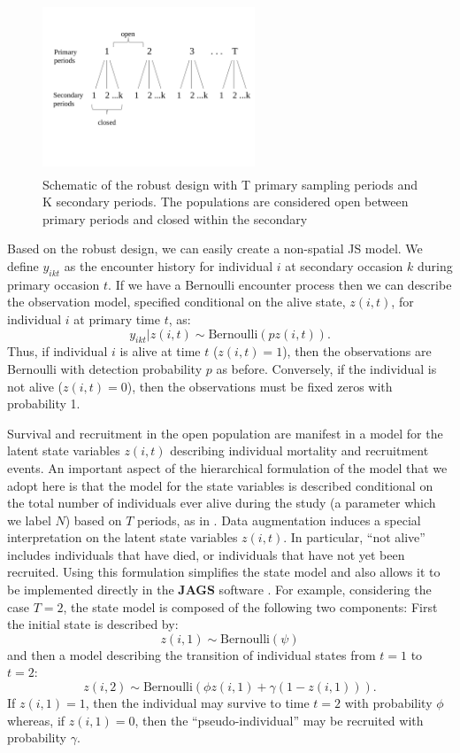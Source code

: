 \begin{figure}[h]
\centering
\includegraphics[height=2in,width=2.5in]{Ch16-Open/figs/RobustDesign.pdf}
\caption{Schematic of the robust design with T primary sampling periods and K secondary periods. The populations
are considered open between primary periods and closed within the secondary}
\label{open.figs.robustdesign}
\end{figure}

Based on the robust design, we can easily create a non-spatial JS model.  We define $y_{ikt}$ as the encounter
history for individual $i$ at secondary occasion $k$ during primary occasion $t$.  If we have a Bernoulli encounter
process then we can describe the observation model, specified
conditional on the alive state, $z(i,t)$, for individual $i$ at primary time $t$, as:
 \[
  y_{ikt}|z(i,t) \sim
\mbox{Bernoulli}(p z(i,t)).
\]
Thus, if individual $i$ is alive at time $t$ ($z(i,t)=1$), then the
observations are Bernoulli with detection probability $p$ as before.  Conversely, if the individual is
not alive ($z(i,t)=0$), then the observations must be fixed zeros with
probability 1.

Survival and recruitment in the open population are manifest in a
model for the latent state variables $z(i,t)$ describing individual
mortality and recruitment events.  An important aspect of the
hierarchical formulation of the model that we adopt here is that the
model for the state variables is described conditional on the total
number of individuals ever alive during the study (a parameter which
we label $N$) based on $T$ periods, as in \cite{schwarz_arnason:1996}.  Data
augmentation induces a special interpretation on the latent state
variables $z(i,t)$.
In particular, ``not alive'' includes individuals
that have died, or individuals that have not yet been recruited.
Using this formulation simplifies the state model and also allows it
to be implemented directly in the \textbf{JAGS} software \cite{royle_dorazio:2008}.
For example, considering the case $T=2$, the state model is composed
of the following two components: First the initial state is described
by:
\[
 z(i,1) \sim \mbox{Bernoulli}(\psi)
\]
and then a model describing the transition of individual states from
$t=1$ to $t=2$:
\[
 z(i,2) \sim \mbox{Bernoulli}( \phi z(i,1)  + \gamma (1-z(i,1)) ).
\]
If $z(i,1)=1$, then the individual may survive to time $t=2$ with
probability $\phi$ whereas, if $z(i,1)=0$, then the
``pseudo-individual'' may be recruited with probability $\gamma$.


